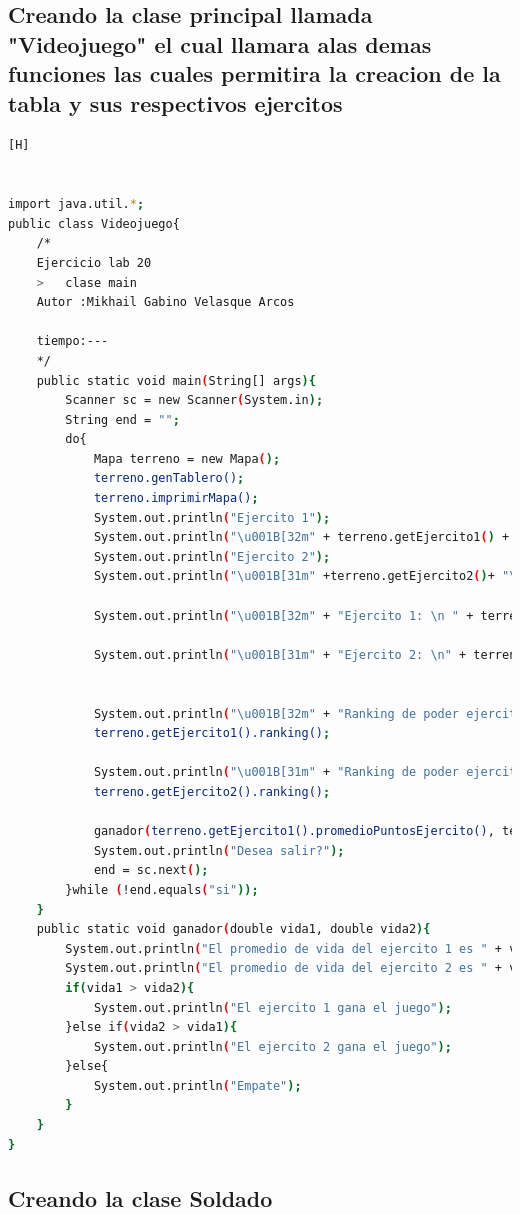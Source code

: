\documentclass{article}
\begin{document}
	\subsection{Creando la clase principal llamada "Videojuego" el cual llamara alas demas funciones las cuales permitira la creacion de la tabla y sus respectivos ejercitos}
		
	\begin{lstlisting}[language=bash,caption={CLASE MAIN o "ViDEOJUEGO"}][H]
	

import java.util.*;
public class Videojuego{
	/*
	Ejercicio lab 20 
	>	clase main 
	Autor :Mikhail Gabino Velasque Arcos

	tiempo:---
	*/
	public static void main(String[] args){
		Scanner sc = new Scanner(System.in);
		String end = "";
		do{
			Mapa terreno = new Mapa();
			terreno.genTablero();
			terreno.imprimirMapa();
			System.out.println("Ejercito 1");
			System.out.println("\u001B[32m" + terreno.getEjercito1() + "\u001B[0m");
			System.out.println("Ejercito 2");
			System.out.println("\u001B[31m" +terreno.getEjercito2()+ "\u001B[0m");

			System.out.println("\u001B[32m" + "Ejercito 1: \n " + terreno.getEjercito1().mayorVidaEjercito()+"\u001B[0m");

			System.out.println("\u001B[31m" + "Ejercito 2: \n" + terreno.getEjercito2().mayorVidaEjercito()+"\u001B[0m");


			System.out.println("\u001B[32m" + "Ranking de poder ejercito 1"+"\u001B[0m");
			terreno.getEjercito1().ranking();

			System.out.println("\u001B[31m" + "Ranking de poder ejercito 2"+"\u001B[0m");
			terreno.getEjercito2().ranking();
			
			ganador(terreno.getEjercito1().promedioPuntosEjercito(), terreno.getEjercito2().promedioPuntosEjercito());
			System.out.println("Desea salir?");
			end = sc.next();
		}while (!end.equals("si"));
	}
	public static void ganador(double vida1, double vida2){
		System.out.println("El promedio de vida del ejercito 1 es " + vida1);
		System.out.println("El promedio de vida del ejercito 2 es " + vida2);
		if(vida1 > vida2){
			System.out.println("El ejercito 1 gana el juego");
		}else if(vida2 > vida1){
			System.out.println("El ejercito 2 gana el juego");
		}else{
			System.out.println("Empate");
		}
	}
}
	\end{lstlisting}	
	
	
	\subsection{Creando la clase Soldado}
		
\end{document}
